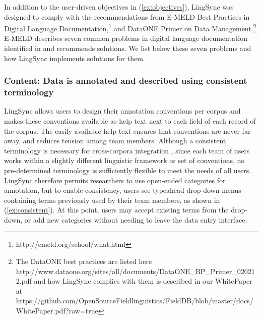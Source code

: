 \documentclass[letterpaper, 12pt, dvips]{mitwpl}
\begin{document}
In addition to the user-driven objectives in (\ref{ex:objectives}), LingSync was designed to comply with the recommendations from %
E-MELD Best Practices in Digital Language Documentation,\footnote{http://emeld.org/school/what.html} and %
DataONE Primer on Data Management.\footnote{The DataONE best practices are listed here http://www.dataone.org/sites/all/documents/DataONE\_BP\_Primer\_020212.pdf and how LingSync complies with them is described in our WhitePaper at https://github.com/OpenSourceFieldlinguistics/FieldDB/blob/master/docs/WhitePaper.pdf?raw=true}
E-MELD describes seven common problems in digital language documentation identified in \cite{Bird:2003} and recommends solutions. We list below these seven problems and how LingSync implements solutions for them.




\subsubsection{\textbf{Content}: Data is annotated and described using consistent terminology} 

LingSync allows users to design their annotation conventions per corpus and makes these conventions available as help text next to each field of each record of the corpus. The easily-available help text ensures that conventions are never far away, and reduces tension among team members.
Although a consistent  terminology is necessary for cross-corpora integration  \citep{Schalley:2012}, since each team of users works within a slightly different linguistic framework or set of conventions, no pre-determined terminology is sufficiently flexible to meet the needs of all users. LingSync therefore permits researchers to use open-ended categories for annotation, but 
to enable consistency, users see typeahead drop-down menus containing terms previously used by their team members, as shown in (\ref{ex:consistent}). At this point, users may accept existing terms from the drop-down, or add new categories without needing to leave the data entry interface.
\end{document}
